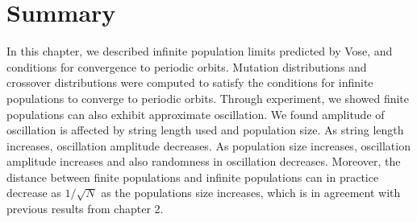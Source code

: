 \section{Summary}
In this chapter, we described infinite population limits predicted by Vose, and conditions 
for convergence to periodic orbits. Mutation distributions and crossover distributions were computed 
to satisfy the conditions for infinite populations to converge to periodic orbits. Through experiment, 
we showed finite populations can also exhibit approximate oscillation. 
We found amplitude of oscillation is affected by string length used and population size. 
As string length increases, oscillation amplitude decreases. 
As population size increases, oscillation amplitude increases and also randomness in oscillation decreases. 
Moreover, the distance between finite populations and infinite populations can in practice decrease 
as $1/\sqrt{N}$ as the populations size increases, which is in agreement with previous results from 
chapter 2.





 
